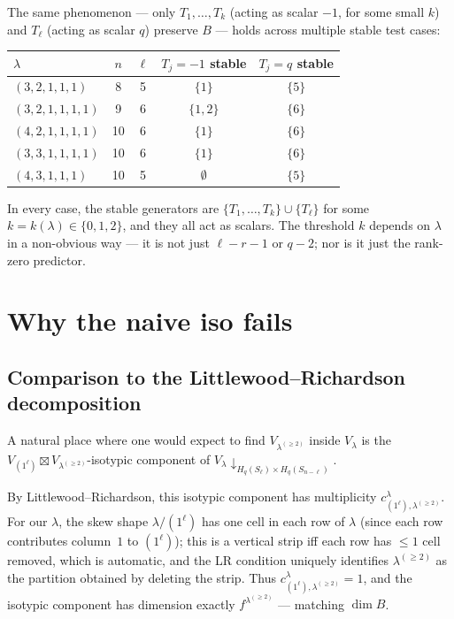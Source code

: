 \documentclass[11pt]{article}
\theoremstyle{definition}
\begin{document}
The same phenomenon — only $T_1, \ldots, T_k$ (acting as scalar $-1$,
for some small $k$) and $T_\ell$ (acting as scalar $q$) preserve $B$
— holds across multiple stable test cases:

\begin{center}
\renewcommand{\arraystretch}{1.15}
\begin{tabular}{lcccc}
\toprule
$\lambda$ & $n$ & $\ell$ & $T_j = -1$ stable & $T_j = q$ stable \\
\midrule
$(3, 2, 1, 1, 1)$       & 8  & 5 & $\{1\}$    & $\{5\}$ \\
$(3, 2, 1, 1, 1, 1)$    & 9  & 6 & $\{1, 2\}$ & $\{6\}$ \\
$(4, 2, 1, 1, 1, 1)$    & 10 & 6 & $\{1\}$    & $\{6\}$ \\
$(3, 3, 1, 1, 1, 1)$    & 10 & 6 & $\{1\}$    & $\{6\}$ \\
$(4, 3, 1, 1, 1)$       & 10 & 5 & $\emptyset$ & $\{5\}$ \\
\bottomrule
\end{tabular}
\end{center}

\noindent In every case, the stable generators are $\{T_1, \ldots, T_k\}
\cup \{T_\ell\}$ for some $k = k(\lambda) \in \{0, 1, 2\}$, and they all
act as scalars. The threshold $k$ depends on $\lambda$ in a non-obvious
way — it is not just $\ell - r - 1$ or $q - 2$; nor is it just the
rank-zero predictor.

\section{Why the naive iso fails}\label{sec:why}

\subsection{Comparison to the Littlewood--Richardson decomposition}

A natural place where one would expect to find $V_{\lambda^{(\ge 2)}}$
inside $V_\lambda$ is the
$V_{(1^\ell)} \boxtimes V_{\lambda^{(\ge 2)}}$-isotypic component of
$V_\lambda \!\downarrow_{H_q(S_\ell) \times H_q(S_{n-\ell})}$.

By Littlewood--Richardson, this isotypic component has multiplicity
$c^\lambda_{(1^\ell), \lambda^{(\ge 2)}}$. For our $\lambda$, the
skew shape $\lambda / (1^\ell)$ has one cell in each row of $\lambda$
(since each row contributes column~$1$ to $(1^\ell)$); this is a
vertical strip iff each row has $\le 1$ cell removed, which is
automatic, and the LR condition uniquely identifies
$\lambda^{(\ge 2)}$ as the partition obtained by deleting the strip.
Thus $c^\lambda_{(1^\ell), \lambda^{(\ge 2)}} = 1$, and the isotypic
component has dimension exactly $f^{\lambda^{(\ge 2)}}$ — matching
$\dim B$.
\end{document}
